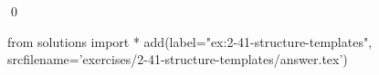
\begin{ex}
  \label{ex:2-41-structure-templates}
  
  \qed
\end{ex}
\begin{python0}
from solutions import *
add(label="ex:2-41-structure-templates",
    srcfilename='exercises/2-41-structure-templates/answer.tex')
\end{python0}
